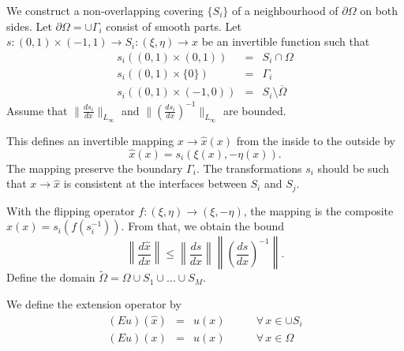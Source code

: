 We construct a non-overlapping covering $\{ S_i \}$ of a neighbourhood 
of $\partial \Omega$ on both sides. 
Let $\partial \Omega = \cup \Gamma_i$ consist of smooth parts.
Let $s : (0,1) \times (-1,1) \rightarrow S_i : (\xi, \eta) \rightarrow x$ be
an invertible function such that 
\begin{eqnarray*}
s_i ( (0,1) \times (0,1) ) & = & S_i \cap \Omega \\
s_i ( (0,1) \times \{ 0 \} ) & = & \Gamma_i \\
s_i ( (0,1) \times (-1,0) ) & = & S_i \setminus \overline \Omega 
\end{eqnarray*}
Assume that $\| \frac{ds_i}{dx} \|_{L_\infty}$ and $\| \left( \frac{ds_i}{dx} \right)^{-1} \|_{L_\infty}$ are bounded. 

This defines an invertible mapping $x \rightarrow \hat x (x)$ from the inside 
to the outside by
$$
\hat x(x) = s_i (\xi(x), -\eta(x)).
$$
The mapping preserve the boundary $\Gamma_i$.
The transformations $s_i$ should be such that $x \rightarrow \hat x$ is
consistent at the interfaces between $S_i$ and $S_j$.

With the flipping operator $f : (\xi, \eta) \rightarrow (\xi, -\eta)$, the
mapping is the composite $\hat x(x) = s_i (f(s_i^{-1}))$. From that, we
obtain the bound
$$
\left\| \frac{d \hat x}{d x } \right\| \leq
         \left\| \frac{ds}{dx} \right\|
         \left\| \left( \frac{ds}{dx} \right)^{-1} \right\|.
$$
Define the domain $\widetilde \Omega = \Omega \cup S_1 \cup \ldots \cup S_M$.

We define the extension operator by
\begin{equation} \label{extension}
\begin{array}{rcll}
(E u) (\hat x) & = & u(x) & \qquad \forall \, x \in \cup S_i \\
(Eu) (x) & = & u(x) & \qquad \forall \, x \in \Omega
\end{array}
\end{equation}

